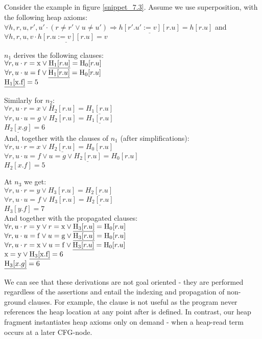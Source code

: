 Consider the example in figure \ref{snippet_7.3}.
Assume we use superposition, with the following heap axioms:\\
$\forall h,r,u,r',u' \cdot (r\neq r' \lor u \neq u') \Rightarrow \underline{h[r'.u':=v][r.u]}=h[r.u]$ and\\
$\forall h,r,u,v \cdot \underline{h[r.u:=v][r.u]}=v$

\bigskip

\noindent
$n_1$ derives the following clauses:\\
$\forall r,u \cdot r=\mathrm{x} \lor \underline{\mathrm{H_1}[r.u]}=\mathrm{H_0}[r.u]$ \\
$\forall r,u \cdot u=\mathrm{f} \lor \underline{\mathrm{H_1}[r.u]}=\mathrm{H_0}[r.u]$ \\
$\underline{\mathrm{H_1[x.f]}}=5$

\noindent
Similarly for $n_2$:\\
$\forall r,u \cdot r=x \lor H_2[r.u]=\underline{H_1[r.u]}$ \\
$\forall r,u \cdot u=g \lor H_2[r.u]=\underline{H_1[r.u]}$ \\
$\underline{H_2[x.g]}=6$ \\
And, together with the clauses of $n_1$ (after simplifications):\\
$\forall r,u \cdot r=x \lor \underline{H_2[r.u]}=H_0[r.u]$ \\
$\forall r,u \cdot u=f \lor u=g \lor \underline{H_2[r.u]}=H_0[r.u]$ \\
$H_2[x.f]=5$ 

\noindent
At $n_3$ we get:\\
$\forall r,u \cdot r=y \lor H_3[r.u]=\underline{H_2[r.u]}$ \\
$\forall r,u \cdot u=f \lor H_3[r.u]=\underline{H_2[r.u]}$ \\
$H_3[y.f]=7$ \\
And together with the propagated clauses:\\
$\forall r,u \cdot r=\mathrm{y} \lor r=\mathrm{x} \lor \underline{\mathrm{H_3}[r.u]}=\mathrm{H_0}[r.u]$ \\
$\forall r,u \cdot u=\mathrm{f} \lor u=\mathrm{g} \lor \underline{\mathrm{H_3}[r.u]}=\mathrm{H_0}[r.u]$ \\
$\forall r,u \cdot r=\mathrm{x} \lor u=\mathrm{f} \lor \underline{\mathrm{H_3}[r.u]}=\mathrm{H_0}[r.u]$ \\
$\mathrm{x=y \lor \underline{H_3[x.f]}=6}$ \\
$\underline{\mathrm{H_3}[x.g]}=6$ 

We can see that these derivations are not goal oriented - they are performed regardless of the assertions and entail the indexing and propagation of non-ground clauses. For example, the clause  is not useful as the program never references the heap location  at any point after  is defined. In contrast, our heap fragment instantiates heap axioms only on demand - when a heap-read term occurs at a later CFG-node.

